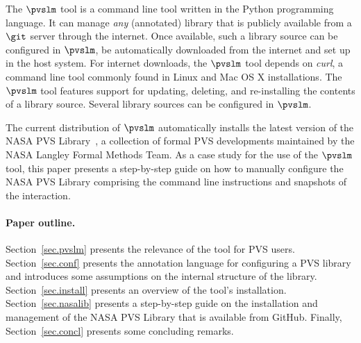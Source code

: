 The $\pvslm$ tool is a command line tool written in the Python
programming language. It can manage {\em any} (annotated) library that
is publicly available from a $\git$ server through the internet.  Once
available, such a library source can be configured in $\pvslm$, be
automatically downloaded from the internet and set up in the host
system. For internet downloads, the $\pvslm$ tool depends on {\em
  curl}, a command line tool commonly found in Linux and Mac OS X
installations. The $\pvslm$ tool features support for updating,
deleting, and re-installing the contents of a library source.  Several
library sources can be configured in $\pvslm$.

The current distribution of $\pvslm$ automatically installs the latest
version of the NASA PVS Library~\cite{nasalib}, a collection of formal
PVS developments maintained by the NASA Langley Formal Methods
Team. As a case study for the use of the $\pvslm$ tool, this paper
presents a step-by-step guide on how to manually configure the NASA
PVS Library comprising the command line instructions and snapshots of
the interaction.

\paragraph{Paper outline.} Section~\ref{sec.pvslm} presents the relevance 
of the tool for PVS users. Section~\ref{sec.conf} presents the
annotation language for configuring a PVS library and introduces some
assumptions on the internal structure of the library. Section~\ref{sec.install} 
presents an overview of the tool's installation. Section~\ref{sec.nasalib} 
presents a step-by-step guide on the installation and management of 
the NASA PVS Library that is available from GitHub. Finally, 
Section~\ref{sec.concl} presents some concluding remarks.
